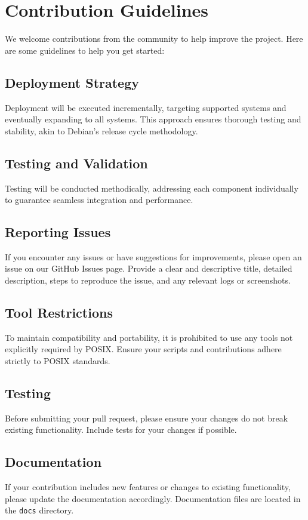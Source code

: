 \section{Contribution Guidelines}
We welcome contributions from the community to help improve the project. Here are some guidelines to help you get started:

\subsection{Deployment Strategy}

Deployment will be executed incrementally, targeting supported systems and eventually expanding to all systems. This approach ensures thorough testing and stability, akin to Debian's release cycle methodology.

\subsection{Testing and Validation}

Testing will be conducted methodically, addressing each component individually to guarantee seamless integration and performance.

\subsection{Reporting Issues}
If you encounter any issues or have suggestions for improvements, please open an issue on our GitHub Issues page. Provide a clear and descriptive title, detailed description, steps to reproduce the issue, and any relevant logs or screenshots.

\subsection{Tool Restrictions}
To maintain compatibility and portability, it is prohibited to use any tools not explicitly required by POSIX. Ensure your scripts and contributions adhere strictly to POSIX standards.

\subsection{Testing}
Before submitting your pull request, please ensure your changes do not break existing functionality. Include tests for your changes if possible.

\subsection{Documentation}
If your contribution includes new features or changes to existing functionality, please update the documentation accordingly. Documentation files are located in the \texttt{docs} directory.

